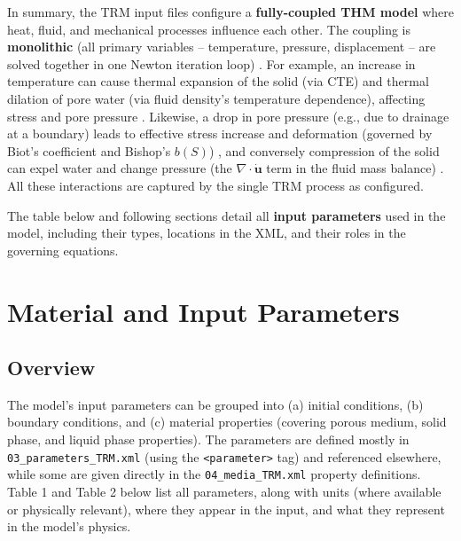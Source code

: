 \documentclass[10pt,a4paper]{article}
\begin{document}
In summary, the TRM input files configure a \textbf{fully-coupled THM model} where heat, fluid, and mechanical processes influence each other. The coupling is \textbf{monolithic} (all primary variables -- temperature, pressure, displacement -- are solved together in one Newton iteration loop) \cite{file:05_time_loop_TRM}. For example, an increase in temperature can cause thermal expansion of the solid (via CTE) and thermal dilation of pore water (via fluid density's temperature dependence), affecting stress and pore pressure \cite{ogs:trm}. Likewise, a drop in pore pressure (e.g., due to drainage at a boundary) leads to effective stress increase and deformation (governed by Biot's coefficient and Bishop's $b(S)$) \cite{ogs:trm, doc:trm_gov_eq}, and conversely compression of the solid can expel water and change pressure (the $\nabla\cdot \dot{\mathbf{u}}$ term in the fluid mass balance) \cite{ogs:trm}. All these interactions are captured by the single TRM process as configured.

The table below and following sections detail all \textbf{input parameters} used in the model, including their types, locations in the XML, and their roles in the governing equations.

\section{Material and Input Parameters}

\subsection*{Overview}
The model's input parameters can be grouped into (a) initial conditions, (b) boundary conditions, and (c) material properties (covering porous medium, solid phase, and liquid phase properties). The parameters are defined mostly in \texttt{03\_parameters\_TRM.xml} (using the \texttt{<parameter>} tag) and referenced elsewhere, while some are given directly in the \texttt{04\_media\_TRM.xml} property definitions. Table 1 and Table 2 below list all parameters, along with units (where available or physically relevant), where they appear in the input, and what they represent in the model's physics.
\end{document}

